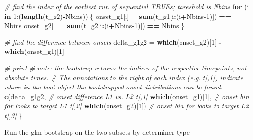 \documentclass[
]{article}
\newenvironment{Shaded}{\begin{snugshade}}{\end{snugshade}}
\newcommand{\CommentTok}[1]{\textcolor[rgb]{0.56,0.35,0.01}{\textit{#1}}}
\newcommand{\ControlFlowTok}[1]{\textcolor[rgb]{0.13,0.29,0.53}{\textbf{#1}}}
\newcommand{\DecValTok}[1]{\textcolor[rgb]{0.00,0.00,0.81}{#1}}
\newcommand{\FunctionTok}[1]{\textcolor[rgb]{0.13,0.29,0.53}{\textbf{#1}}}
\newcommand{\NormalTok}[1]{#1}
\newcommand{\OtherTok}[1]{\textcolor[rgb]{0.56,0.35,0.01}{#1}}
\newcommand{\SpecialCharTok}[1]{\textcolor[rgb]{0.81,0.36,0.00}{\textbf{#1}}}
\begin{document}
\begin{Shaded}
\begin{Highlighting}[]
  \CommentTok{\# find the index of the earliest run of sequential TRUEs; threshold is Nbins}
  \ControlFlowTok{for}\NormalTok{ (i }\ControlFlowTok{in} \DecValTok{1}\SpecialCharTok{:}\NormalTok{(}\FunctionTok{length}\NormalTok{(t\_g2)}\SpecialCharTok{{-}}\NormalTok{Nbins)) \{}
\NormalTok{    onset\_g1[i] }\OtherTok{=} \FunctionTok{sum}\NormalTok{(t\_g1[i}\SpecialCharTok{:}\NormalTok{(i}\SpecialCharTok{+}\NormalTok{Nbins}\DecValTok{{-}1}\NormalTok{)]) }\SpecialCharTok{==}\NormalTok{ Nbins}
\NormalTok{    onset\_g2[i] }\OtherTok{=} \FunctionTok{sum}\NormalTok{(t\_g2[i}\SpecialCharTok{:}\NormalTok{(i}\SpecialCharTok{+}\NormalTok{Nbins}\DecValTok{{-}1}\NormalTok{)]) }\SpecialCharTok{==}\NormalTok{ Nbins}
\NormalTok{  \}}
  
  \CommentTok{\# find the difference between onsets}
\NormalTok{  delta\_g1g2 }\OtherTok{=} \FunctionTok{which}\NormalTok{(onset\_g2)[}\DecValTok{1}\NormalTok{] }\SpecialCharTok{{-}} \FunctionTok{which}\NormalTok{(onset\_g1)[}\DecValTok{1}\NormalTok{]}
  
  \CommentTok{\# print }
  \CommentTok{\# note: the bootstrap returns the indices of the respective timepoints, not absolute times. }
  \CommentTok{\# The annotations to the right of each index (e.g. t[,1]) indicate where in the boot object the bootstrapped onset distributions can be found.}
  \FunctionTok{c}\NormalTok{(delta\_g1g2,         }\CommentTok{\# onset difference L1 vs. L2 t[,1]}
    \FunctionTok{which}\NormalTok{(onset\_g1)[}\DecValTok{1}\NormalTok{], }\CommentTok{\# onset bin for looks to target L1 t[,2]}
    \FunctionTok{which}\NormalTok{(onset\_g2)[}\DecValTok{1}\NormalTok{])  }\CommentTok{\# onset bin for looks to target L2 t[,3]}
\NormalTok{\}}
\end{Highlighting}
\end{Shaded}

Run the glm bootstrap on the two subsets by determiner type
\end{document}
